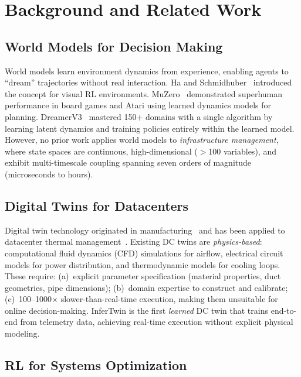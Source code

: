 \documentclass[conference,10pt]{IEEEtran}
\begin{document}
\section{Background and Related Work}
\label{sec:bg}

\subsection{World Models for Decision Making}

World models learn environment dynamics from experience, enabling agents to ``dream'' trajectories without real interaction. Ha and Schmidhuber~\cite{ha2018world} introduced the concept for visual RL environments. MuZero~\cite{schrittwieser2020muzero} demonstrated superhuman performance in board games and Atari using learned dynamics models for planning. DreamerV3~\cite{hafner2023dreamerv3} mastered 150+ domains with a single algorithm by learning latent dynamics and training policies entirely within the learned model. However, no prior work applies world models to \emph{infrastructure management}, where state spaces are continuous, high-dimensional ($>$100 variables), and exhibit multi-timescale coupling spanning seven orders of magnitude (microseconds to hours).

\subsection{Digital Twins for Datacenters}

Digital twin technology originated in manufacturing~\cite{grieves2014digital} and has been applied to datacenter thermal management~\cite{tao2018digital,kiran2022digital}. Existing DC twins are \emph{physics-based}: computational fluid dynamics (CFD) simulations for airflow, electrical circuit models for power distribution, and thermodynamic models for cooling loops. These require: (a)~explicit parameter specification (material properties, duct geometries, pipe dimensions); (b)~domain expertise to construct and calibrate; (c)~100--1000$\times$ slower-than-real-time execution, making them unsuitable for online decision-making. InferTwin is the first \emph{learned} DC twin that trains end-to-end from telemetry data, achieving real-time execution without explicit physical modeling.

\subsection{RL for Systems Optimization}
\end{document}
